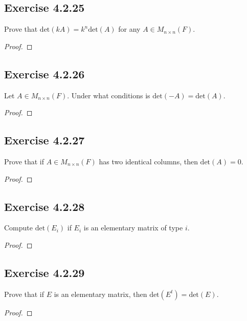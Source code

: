 \subsection*{Exercise 4.2.25} Prove that \( \text{det}(kA) = k^{n} \text{det}(A) \) for any \( A \in {M}_{n \times n}(F) \).
\begin{proof}

\end{proof}

\subsection*{Exercise 4.2.26} Let \( A \in {M}_{n \times n}(F) \). Under what conditions is \( \text{det}(-A) = \text{det}(A) \).
\begin{proof}

\end{proof}

\subsection*{Exercise 4.2.27} Prove that if \( A \in {M}_{n \times n}(F) \) has two identical columns, then \( \text{det}(A) = 0  \).
\begin{proof}

\end{proof}

\subsection*{Exercise 4.2.28} Compute \( \text{det}({E}_{i})  \) if \( {E}_{i} \) is an elementary matrix of type \( i  \).
\begin{proof}

\end{proof}

\subsection*{Exercise 4.2.29} Prove that if \( E  \) is an elementary matrix, then \( \text{det}(E^{t}) = \text{det}(E) \).
\begin{proof}

\end{proof}



